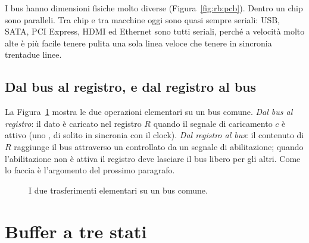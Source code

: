 I bus hanno dimensioni fisiche molto diverse (Figura~\ref{fig:rb:pcb}). Dentro
un chip sono paralleli. Tra chip e tra macchine oggi sono quasi sempre seriali:
USB, SATA, PCI Express, HDMI ed Ethernet sono tutti seriali, perché a velocità
molto alte è più facile tenere pulita una sola linea veloce che tenere in
sincronia trentadue linee.

\subsection{Dal bus al registro, e dal registro al bus}

La Figura~\ref{fig:rb:busreg} mostra le due operazioni elementari su un bus
comune. \emph{Dal bus al registro}: il dato è caricato nel registro $R$ quando
il segnale di caricamento $c$ è attivo (uno , di solito in
sincronia con il clock). \emph{Dal registro al bus}: il contenuto di $R$
raggiunge il bus attraverso un  controllato da un segnale di
abilitazione; quando l'abilitazione non è attiva il registro deve lasciare il
bus libero per gli altri. Come lo faccia è l'argomento del prossimo paragrafo.

\begin{figure}[htb]
\centering
{}
\caption{I due trasferimenti elementari su un bus comune.}
\label{fig:rb:busreg}
\end{figure}

\section{Buffer a tre stati}

